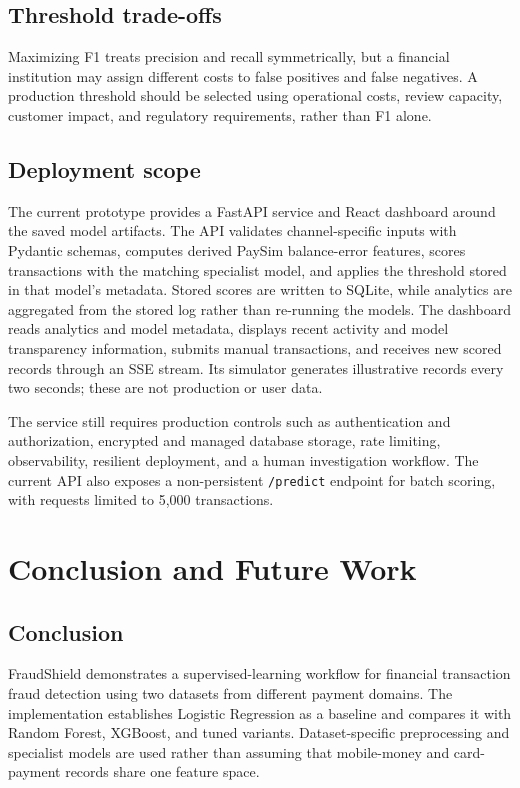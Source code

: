 \documentclass[12pt,a4paper]{report}
\begin{document}
\section{Threshold trade-offs}
Maximizing F1 treats precision and recall symmetrically, but a financial institution may assign different costs to false positives and false negatives. A production threshold should be selected using operational costs, review capacity, customer impact, and regulatory requirements, rather than F1 alone.

\section{Deployment scope}
The current prototype provides a FastAPI service and React dashboard around the saved model artifacts. The API validates channel-specific inputs with Pydantic schemas, computes derived PaySim balance-error features, scores transactions with the matching specialist model, and applies the threshold stored in that model's metadata. Stored scores are written to SQLite, while analytics are aggregated from the stored log rather than re-running the models. The dashboard reads analytics and model metadata, displays recent activity and model transparency information, submits manual transactions, and receives new scored records through an SSE stream. Its simulator generates illustrative records every two seconds; these are not production or user data.

The service still requires production controls such as authentication and authorization, encrypted and managed database storage, rate limiting, observability, resilient deployment, and a human investigation workflow. The current API also exposes a non-persistent \texttt{/predict} endpoint for batch scoring, with requests limited to 5,000 transactions.

\chapter{Conclusion and Future Work}
\section{Conclusion}
FraudShield demonstrates a supervised-learning workflow for financial transaction fraud detection using two datasets from different payment domains. The implementation establishes Logistic Regression as a baseline and compares it with Random Forest, XGBoost, and tuned variants. Dataset-specific preprocessing and specialist models are used rather than assuming that mobile-money and card-payment records share one feature space.
\end{document}
